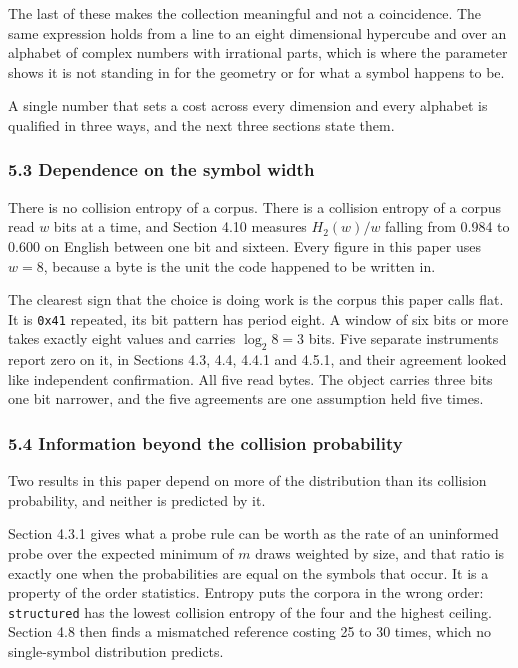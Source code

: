 The last of these makes the collection meaningful and not a coincidence. The same expression holds from a line to an eight dimensional hypercube and over an alphabet of complex numbers with irrational parts, which is where the parameter shows it is not standing in for the geometry or for what a symbol happens to be.

A single number that sets a cost across every dimension and every alphabet is qualified in three ways, and the next three sections state them.

\subsubsection{5.3 Dependence on the symbol width}

There is no collision entropy of a corpus. There is a collision entropy of a corpus read \(w\) bits at a time, and Section 4.10 measures \(H_2(w)/w\) falling from 0.984 to 0.600 on English between one bit and sixteen. Every figure in this paper uses \(w = 8\), because a byte is the unit the code happened to be written in.

The clearest sign that the choice is doing work is the corpus this paper calls flat. It is \texttt{0x41} repeated, its bit pattern has period eight. A window of six bits or more takes exactly eight values and carries \(\log_2 8 = 3\) bits. Five separate instruments report zero on it, in Sections 4.3, 4.4, 4.4.1 and 4.5.1, and their agreement looked like independent confirmation. All five read bytes. The object carries three bits one bit narrower, and the five agreements are one assumption held five times.

\subsubsection{5.4 Information beyond the collision probability}

Two results in this paper depend on more of the distribution than its collision probability, and neither is predicted by it.

Section 4.3.1 gives what a probe rule can be worth as the rate of an uninformed probe over the expected minimum of \(m\) draws weighted by size, and that ratio is exactly one when the probabilities are equal on the symbols that occur. It is a property of the order statistics. Entropy puts the corpora in the wrong order: \texttt{structured} has the lowest collision entropy of the four and the highest ceiling. Section 4.8 then finds a mismatched reference costing 25 to 30 times, which no single-symbol distribution predicts.

